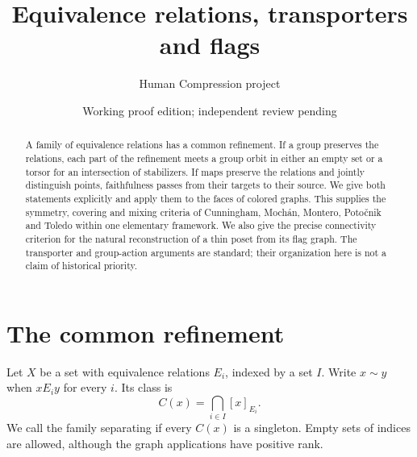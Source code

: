 \documentclass[a4paper,11pt]{article}
\title{Equivalence relations, transporters and flags}
\author{Human Compression project}\date{Working proof edition; independent review pending}
\begin{document}
\maketitle
\begin{abstract}
A family of equivalence relations has a common refinement. If a group
preserves the relations, each part of the refinement meets a group orbit
in either an empty set or a torsor for an intersection of stabilizers.
If maps preserve the relations and jointly distinguish points, faithfulness
passes from their targets to their source. We give both statements explicitly
and apply them to the faces of colored graphs. This supplies the symmetry,
covering and mixing criteria of Cunningham, Moch\'an, Montero, Poto\v cnik and
Toledo within one elementary framework. We also give the precise connectivity
criterion for the natural reconstruction of a thin poset from its flag graph.
The transporter and group-action arguments are standard; their organization
here is not a claim of historical priority.
\end{abstract}

\section{The common refinement}
Let $X$ be a set with equivalence relations $E_i$, indexed by a set $I$.
Write $x\sim y$ when $xE_i y$ for every $i$. Its class is
\[
 C(x)=\bigcap_{i\in I}[x]_{E_i}.
\]
We call the family separating if every $C(x)$ is a singleton. Empty sets
of indices are allowed, although the graph applications have positive rank.
\end{document}
